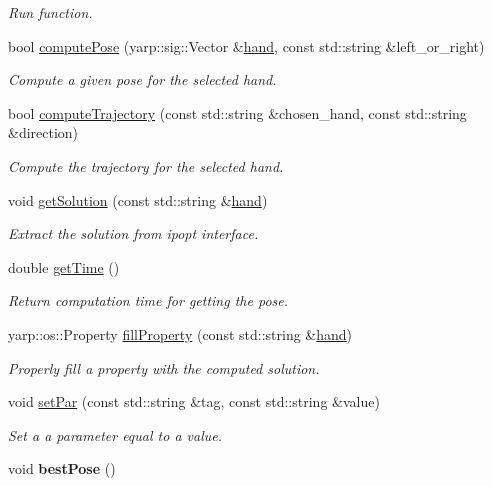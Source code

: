 \begin{DoxyCompactItemize}
\begin{DoxyCompactList}\small\item\em Run function. \end{DoxyCompactList}\item 
bool \hyperlink{classGraspComputation_a28e28e973bd9af1d96bfa7548dc1c029}{compute\+Pose} (yarp\+::sig\+::\+Vector \&\hyperlink{classGraspComputation_a180a48b0a2d730ba28545a18d9f0f7fc}{hand}, const std\+::string \&left\+\_\+or\+\_\+right)
\begin{DoxyCompactList}\small\item\em Compute a given pose for the selected hand. \end{DoxyCompactList}\item 
bool \hyperlink{classGraspComputation_ab68ef4347c7efa9540ab68ff5abf0254}{compute\+Trajectory} (const std\+::string \&chosen\+\_\+hand, const std\+::string \&direction)
\begin{DoxyCompactList}\small\item\em Compute the trajectory for the selected hand. \end{DoxyCompactList}\item 
void \hyperlink{classGraspComputation_a49b0efdf7da5147e987cbf05be135e2f}{get\+Solution} (const std\+::string \&\hyperlink{classGraspComputation_a180a48b0a2d730ba28545a18d9f0f7fc}{hand})
\begin{DoxyCompactList}\small\item\em Extract the solution from ipopt interface. \end{DoxyCompactList}\item 
double \hyperlink{classGraspComputation_a75fcb98c9e15f9aac14ea429f625e662}{get\+Time} ()
\begin{DoxyCompactList}\small\item\em Return computation time for getting the pose. \end{DoxyCompactList}\item 
yarp\+::os\+::\+Property \hyperlink{classGraspComputation_a82ff5a0626b48c45d2fc223ecd16d581}{fill\+Property} (const std\+::string \&\hyperlink{classGraspComputation_a180a48b0a2d730ba28545a18d9f0f7fc}{hand})
\begin{DoxyCompactList}\small\item\em Properly fill a property with the computed solution. \end{DoxyCompactList}\item 
void \hyperlink{classGraspComputation_a5a28918e89faff29fce361c7b5efb58f}{set\+Par} (const std\+::string \&tag, const std\+::string \&value)
\begin{DoxyCompactList}\small\item\em Set a a parameter equal to a value. \end{DoxyCompactList}\item 
void {\bfseries best\+Pose} ()\label{classGraspComputation_ac5d65db1eac887de3513e7e4558cb712}

\end{DoxyCompactItemize}
